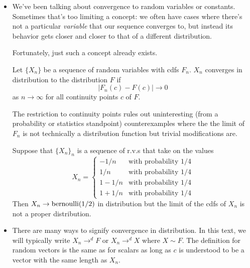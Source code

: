 \begin{itemize}

\item We've been talking about convergence to random variables or
  constants.  Sometimes that's too limiting a concept: we often have
  cases where there's not a particular \emph{variable} that our
  sequence converges to, but instead its behavior gets closer and
  closer to that of a different distribution.

  Fortunately, just such a concept already exists.

  \begin{defn}
    Let $\{X_n\}$ be a sequence of random variables with cdfs $F_n$.
    $X_n$ converges in distribution to the distribution $F$ if
    \begin{equation*}
      \lvert F_n(c) - F(c) \rvert \to 0
    \end{equation*}
    as $n \to \infty$ for all continuity points $c$ of $F$.
  \end{defn}

  The restriction to continuity points rules out uninteresting (from a
  probability or statistics standpoint) counterexamples where the the
  limit of $F_n$ is not technically a distribution function but
  trivial modifications are.

  \begin{ex}\label{convergenceInDist}
    Suppose that $\{X_n\}_n$ is a sequence of r.v.s that take on the
    values
    \begin{equation*}
      X_n =
      \begin{cases}
        -1/n & \text{with probability 1/4} \\
        1/n  & \text{with probability 1/4} \\
        1 - 1/n & \text{with probability 1/4} \\
        1 + 1/n & \text{with probability 1/4}
      \end{cases}
    \end{equation*}
    Then $X_n \to \operatorname{bernoulli}(1/2)$ in distribution but the limit of the
    cdfs of $X_n$ is not a proper distribution.
  \end{ex}

\item There are many ways to signify convergence in distribution.  In
  this text, we will typically write $X_n \to^d F$ or $X_n \to^d X$ where
  $X \sim F$.  The definition for random vectors is the same as for
  scalars as long as $c$ is understood to be a vector with the same
  length as $X_n$.


\end{itemize}
